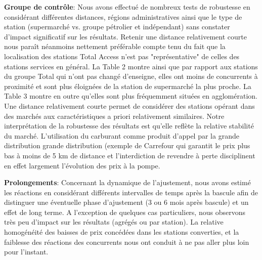 \documentclass[11pt]{article}
\begin{document}
\textbf{Groupe de contrôle}: Nous avons effectué de nombreux tests de robustesse en considérant différentes distances, régions administratives ainsi que le type de station (supermarché vs. groupe pétrolier et indépendant) sans constater d'impact significatif sur les résultats. Retenir une distance relativement courte nous paraît néanmoins nettement préférable compte tenu du fait que la localisation des stations Total Access n'est pas "représentative" de celles des stations services en général. La Table 2 montre ainsi que par rapport aux stations du groupe Total qui n'ont pas changé d'enseigne, elles ont moins  de concurrents à proximité et sont plus éloignées de la station de supermarché la plus proche. La Table 3 montre en outre qu'elles sont plus fréquemment situées en agglomération. Une distance relativement courte permet de considérer des stations opérant dans des marchés aux caractéristiques a priori relativement similaires.
Notre interprétation de la robustesse des résultats est qu'elle reflète la relative stabilité du marché. L'utilisation du carburant  comme produit d'appel par la grande distribution grande distribution (exemple de Carrefour qui garantit le prix plus bas à moins de 5 km de distance et l'interdiction de revendre à perte disciplinent en effet largement l'évolution des prix à la pompe.

\medskip

\textbf{Prolongements}: Concernant la dynamique de l'ajustement, nous avons estimé les réactions en considérant différents intervalles de temps après la bascule afin de distinguer une éventuelle phase d'ajustement (3 ou 6 mois après bascule) et un effet de long terme. A l'exception de quelques cas particuliers, nous observons très peu d'impact sur les résultats (agrégés ou par station). La relative homogénéité des baisses de prix concédées dans les stations converties, et la faiblesse des réactions des concurrents nous ont conduit à ne pas aller plus loin pour l'instant.

\medskip
\end{document}
